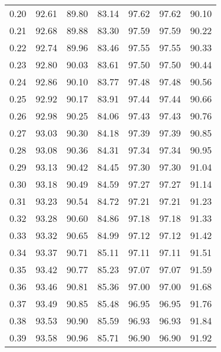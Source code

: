\begin{tabular}{|c|c|c|c|c|c|c|}
      0.20 &     92.61 &     89.80 &      83.14 &   97.62 &      97.62 &         90.10 \\
      0.21 &     92.68 &     89.88 &      83.30 &   97.59 &      97.59 &         90.22 \\
      0.22 &     92.74 &     89.96 &      83.46 &   97.55 &      97.55 &         90.33 \\
      0.23 &     92.80 &     90.03 &      83.61 &   97.50 &      97.50 &         90.44 \\
      0.24 &     92.86 &     90.10 &      83.77 &   97.48 &      97.48 &         90.56 \\
      0.25 &     92.92 &     90.17 &      83.91 &   97.44 &      97.44 &         90.66 \\
      0.26 &     92.98 &     90.25 &      84.06 &   97.43 &      97.43 &         90.76 \\
      0.27 &     93.03 &     90.30 &      84.18 &   97.39 &      97.39 &         90.85 \\
      0.28 &     93.08 &     90.36 &      84.31 &   97.34 &      97.34 &         90.95 \\
      0.29 &     93.13 &     90.42 &      84.45 &   97.30 &      97.30 &         91.04 \\
      0.30 &     93.18 &     90.49 &      84.59 &   97.27 &      97.27 &         91.14 \\
      0.31 &     93.23 &     90.54 &      84.72 &   97.21 &      97.21 &         91.23 \\
      0.32 &     93.28 &     90.60 &      84.86 &   97.18 &      97.18 &         91.33 \\
      0.33 &     93.32 &     90.65 &      84.99 &   97.12 &      97.12 &         91.42 \\
      0.34 &     93.37 &     90.71 &      85.11 &   97.11 &      97.11 &         91.51 \\
      0.35 &     93.42 &     90.77 &      85.23 &   97.07 &      97.07 &         91.59 \\
      0.36 &     93.46 &     90.81 &      85.36 &   97.00 &      97.00 &         91.68 \\
      0.37 &     93.49 &     90.85 &      85.48 &   96.95 &      96.95 &         91.76 \\
      0.38 &     93.53 &     90.90 &      85.59 &   96.93 &      96.93 &         91.84 \\
      0.39 &     93.58 &     90.96 &      85.71 &   96.90 &      96.90 &         91.92 \\

\end{tabular}
